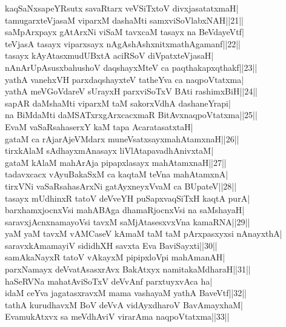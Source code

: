 \documentclass{article}
\begin{document}
kaqSaNxsapeYRsutx savaRtarx veVSiTxtoV divxjasatatxmaH|\\
tamugarxteVjasaM viparxM dashaMti samxviSoVlabxNAH||21||\\
saMpArxpayx gAtArxNi viSaM tavxcaM tasayx na BeVdayeVtf|\\
teVjasA tasayx viparxsayx nAgAshAshxnitxmathAgamanf||22||\\
tasayx kAyAtasxmudUBxtA aciRSoV diVpatxteVjasaH|\\
nAnArUpAsusxbahushoV daqshayxMteV ca paqthakapxqthakf||23||\\
yathA vanehxVH parxdaqshayxteV tatheYva ca naqpoVtatxma|\\
yathA meVGoVdareV sUrayxH parxviSoTxV BAti rashimxBiH||24||\\
sapAR daMshaMti viparxM taM sakorxVdhA dashaneYrapi|\\
na BiMdaMti daMSATxrxgArxcacxmaR BitAvxnaqpoVtatxma||25||\\
EvaM vaSaRsahaserxY kaM tapa AcaratasatxtaH|\\
gataM ca rAjarAjeVMdarx muneVsatxsayxmahAtamxnaH||26||\\
tirxkAlaM sAdhayxmAnasayx liVlAtapavadhAnivxtaM|\\
gataM kAlaM mahArAja pipapxlasayx mahAtamxnaH||27||\\
tadavxcacx vAyuBakaSxM ca kaqtaM teVna mahAtamxnA|\\
tirxVNi vaSaRsahasArxNi gatAyxneyxVvaM ca BUpateV||28||\\
tasayx mUdhinxR tatoV deVveYH puSapxvaqSiTxH kaqtA purA|\\
barxhamxjocnxVsi mahABAga dhamaRjocnxVsi na saMshayaH|\\
saravxjAcnxnamayoVsi tavxM saMjAtasesxvxVna kamaRNA||29||\\
yaM yaM tavxM vAMCaseV kAmaM taM taM pArxpasxyxsi nAnayxthA|\\
saravxkAmamayiV sididhXH savxta Eva BaviSayxti||30||\\
samAkaNayxR tatoV vAkayxM pipipxloVpi mahAmanAH|\\
parxNamayx deVvatAsasxrAvx BakAtxyx namitakaMdharaH||31||\\
haSeRVNa mahatAviSoTxV deVvAnf parxtuyxvAca ha|\\
idaM ceYva jagatasxravxM mama vashayaM yathA BaveVtf||32||\\
tathA kurudhavxM BoV deVvA vidAyxdharoV BavAmayxhaM|\\
EvamukAtxvx sa meVdhAviV virarAma naqpoVtatxma||33||\\
\end{document}
